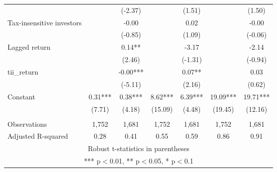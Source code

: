 \documentclass[]{article}
\begin{document}
\begin{tabular}{lcccccc}
 &  & (-2.37) &  & (1.51) &  & (1.50) \\
Tax-insensitive investors &  & -0.00 &  & 0.02 &  & -0.00 \\
 &  & (-0.85) &  & (1.09) &  & (-0.06) \\
Lagged return &  & 0.14** &  & -3.17 &  & -2.14 \\
 &  & (2.46) &  & (-1.31) &  & (-0.94) \\
tii\_return &  & -0.00*** &  & 0.07** &  & 0.03 \\
 &  & (-5.11) &  & (2.16) &  & (0.62) \\
Constant & 0.31*** & 0.38*** & 8.62*** & 6.39*** & 19.09*** & 19.71*** \\
 & (7.71) & (4.18) & (15.09) & (4.48) & (19.45) & (12.16) \\
 &  &  &  &  &  &  \\
Observations & 1,752 & 1,681 & 1,752 & 1,681 & 1,752 & 1,681 \\
 Adjusted R-squared & 0.28 & 0.41 & 0.55 & 0.59 & 0.86 & 0.91 \\ \hline
\multicolumn{7}{c}{ Robust t-statistics in parentheses} \\
\multicolumn{7}{c}{ *** p$<$0.01, ** p$<$0.05, * p$<$0.1} \\
\end{tabular}
\end{document}
